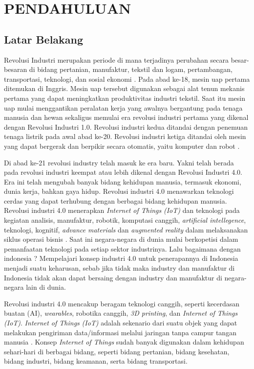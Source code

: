 \chapter{PENDAHULUAN}

\section{Latar Belakang}
Revolusi Industri merupakan periode di mana terjadinya perubahan secara besar-besaran di bidang pertanian, manufaktur, tekstil dan logam, pertambangan, transportasi, teknologi, dan sosial ekonomi . Pada abad ke-18, mesin uap pertama ditemukan di Inggris. Mesin uap tersebut digunakan sebagai alat tenun mekanis pertama yang dapat meningkatkan produktivitas industri tekstil. Saat itu mesin uap mulai menggantikan peralatan kerja yang awalnya bergantung pada tenaga manusia dan hewan sekaligus memulai era revolusi industri pertama yang dikenal dengan Revolusi Industri 1.0. Revolusi industri kedua ditandai dengan penemuan tenaga listrik pada awal abad ke-20. Revolusi industri ketiga ditandai oleh mesin yang dapat bergerak dan berpikir secara otomatis, yaitu komputer dan robot . 

Di abad ke-21 revolusi industry telah masuk ke era baru. Yakni telah berada pada revolusi industri keempat atau lebih dikenal dengan Revolusi Industri 4.0. Era ini telah mengubah banyak bidang kehidupan manusia, termasuk ekonomi, dunia kerja, bahkan gaya hidup. Revolusi industri 4.0 menawarkan teknologi cerdas yang dapat terhubung dengan berbagai bidang kehidupan manusia. Revolusi industri 4.0 menerapkan \textit{Internet of Things} \textit{(IoT)} dan teknologi pada kegiatan analisis, manufaktur, robotik, komputasi canggih, \textit{artificial intellegence}, teknologi, kognitif, \textit{advance materials} dan \textit{augmented reality} dalam melaksanakan siklus operasi bisnis . Saat ini negara-negara di dunia mulai berkopetisi dalam pemanfaatan teknologi pada setiap sektor industrinya. Lalu bagaimana dengan indonesia ? Mempelajari konsep industri 4.0 untuk penerapannya di Indonesia menjadi suatu keharusan, sebab jika tidak maka industry dan manufaktur di Indonesia tidak akan dapat bersaing dengan industry dan manufaktur di negara-negara lain di dunia.

Revolusi industri 4.0 mencakup beragam teknologi canggih, seperti kecerdasan buatan (AI), \textit{wearables}, robotika canggih, \textit{3D printing}, dan \textit{Internet of Things} \textit{(IoT)}. \textit{Internet of Things} \textit{(IoT)} adalah sekenario dari suatu objek yang dapat melakukan pengiriman data/informasi melalui jaringan tanpa campur tangan manusia . Konsep \textit{Internet of Things} sudah banyak digunakan dalam kehidupan sehari-hari di berbagai bidang, seperti bidang pertanian, bidang kesehatan, bidang industri, bidang keamanan, serta bidang transportasi.

